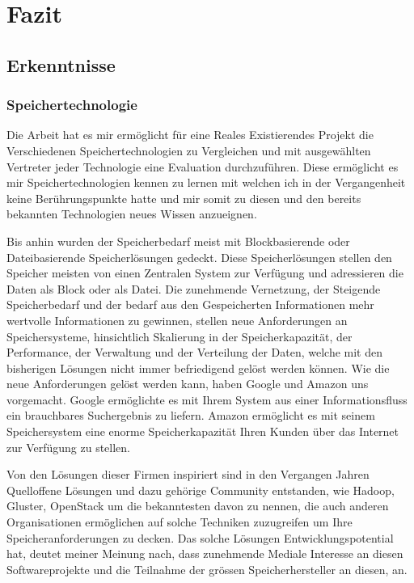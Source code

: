 \cleardoublepage
\chapter{Fazit}
\section{Erkenntnisse}

\subsection{Speichertechnologie}
Die Arbeit hat es mir ermöglicht für eine Reales Existierendes Projekt die Verschiedenen Speichertechnologien zu Vergleichen und mit ausgewählten Vertreter jeder Technologie eine Evaluation durchzuführen. Diese ermöglicht es mir Speichertechnologien kennen zu lernen mit welchen ich in der Vergangenheit keine Berührungspunkte hatte und mir somit zu diesen und den bereits bekannten Technologien neues Wissen anzueignen.

Bis anhin wurden der Speicherbedarf meist mit Blockbasierende oder Dateibasierende Speicherlösungen gedeckt. Diese Speicherlösungen stellen den Speicher meisten von einen Zentralen System zur Verfügung und adressieren die Daten als Block oder als Datei.
Die zunehmende Vernetzung, der Steigende Speicherbedarf und der bedarf aus den Gespeicherten Informationen mehr wertvolle Informationen zu gewinnen, stellen neue  Anforderungen an Speichersysteme, hinsichtlich Skalierung in der Speicherkapazität, der Performance, der Verwaltung und der Verteilung der Daten, welche mit den bisherigen Lösungen nicht immer befriedigend gelöst werden können. Wie die neue Anforderungen gelöst werden kann, haben Google und Amazon uns vorgemacht. Google ermöglichte es mit Ihrem System aus einer Informationsfluss ein brauchbares Suchergebnis zu liefern. Amazon ermöglicht es mit seinem Speichersystem eine enorme Speicherkapazität Ihren Kunden über das Internet zur Verfügung zu stellen. 

Von den Lösungen dieser Firmen inspiriert sind in den Vergangen Jahren Quelloffene Lösungen und dazu gehörige Community entstanden, wie Hadoop, Gluster, OpenStack um die bekanntesten davon zu nennen, die auch anderen Organisationen ermöglichen auf solche Techniken zuzugreifen um Ihre Speicheranforderungen zu decken. Das solche Lösungen Entwicklungspotential hat, deutet meiner Meinung nach, dass zunehmende Mediale Interesse an diesen Softwareprojekte und die Teilnahme der grössen Speicherhersteller an diesen, an. 

